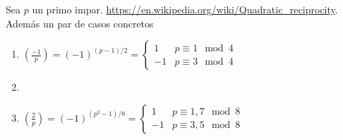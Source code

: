 \documentclass[CR.tex]{subfiles}
\begin{document}
\begin{teorema}
Sea $p$ un primo impar. \url{https://en.wikipedia.org/wiki/Quadratic_reciprocity}. Además un par de casos concretos

\begin{enumerate}
\item $(\frac{-1}{p})=(-1)^{(p-1)/2}=\begin{cases}
1 & p\equiv 1\mod 4\\
-1 & p\equiv 3\mod 4
\end{cases}$

\item 
\item $(\frac{2}{p})=(-1)^{(p^2-1)/8}=\begin{cases}
1 & p\equiv 1,7\mod 8\\
-1 & p\equiv 3,5\mod 8
\end{cases}$
\end{enumerate}
\end{teorema}
\end{document}
